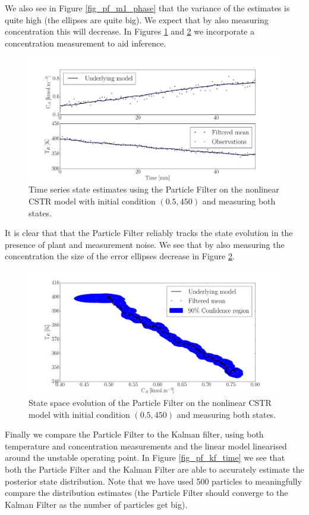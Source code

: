\documentclass[../masters.tex]{subfiles}
\begin{document}
We also see in Figure \ref{fig_pf_m1_phase} that the variance of the estimates is quite high (the ellipses are quite big). We expect that by also measuring concentration this will decrease. In Figures \ref{fig_pf_m2_time} and \ref{fig_pf_m2_phase} we incorporate a concentration measurement to aid inference. 
\begin{figure}[H] 
\centering
\includegraphics[scale=0.30]{pf_m2_time.pdf}
\caption{Time series state estimates using the Particle Filter on the nonlinear CSTR model with initial condition $(0.5, 450)$ and measuring both states.}
\label{fig_pf_m2_time}
\end{figure}
It is clear that that the Particle Filter reliably tracks the state evolution in the presence of plant and measurement noise. We see that by also measuring the concentration the size of the error ellipses decrease in Figure \ref{fig_pf_m2_phase}. 
\begin{figure}[H] 
\centering
\includegraphics[scale=0.30]{pf_m2_phase.pdf}
\caption{State space evolution of the Particle Filter on the nonlinear CSTR model with initial condition $(0.5, 450)$ and measuring both states.}
\label{fig_pf_m2_phase}
\end{figure}
Finally we compare the Particle Filter to the Kalman filter, using both temperature and concentration measurements and the linear model linearised around the unstable operating point. In Figure \ref{fig_pf_kf_time} we see that both the Particle Filter and the Kalman Filter are able to accurately estimate the posterior state distribution. Note that we have used 500 particles to meaningfully compare the distribution estimates (the Particle Filter should converge to the Kalman Filter as the number of particles get big).
\end{document}
